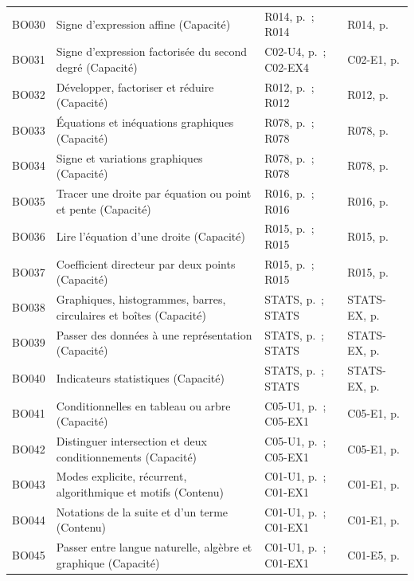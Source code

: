 \begin{longtable}{p{.1\linewidth}p{.43\linewidth}p{.19\linewidth}p{.16\linewidth}}
BO030 & Signe d’expression affine (Capacité) & R014, p.\,\pageref{R014} ; R014 & R014, p.\,\pageref{R014} \\
BO031 & Signe d’expression factorisée du second degré (Capacité) & C02-U4, p.\,\pageref{C02-U4} ; C02-EX4 & C02-E1, p.\,\pageref{C02-E1} \\
BO032 & Développer, factoriser et réduire (Capacité) & R012, p.\,\pageref{R012} ; R012 & R012, p.\,\pageref{R012} \\
BO033 & Équations et inéquations graphiques (Capacité) & R078, p.\,\pageref{R078} ; R078 & R078, p.\,\pageref{R078} \\
BO034 & Signe et variations graphiques (Capacité) & R078, p.\,\pageref{R078} ; R078 & R078, p.\,\pageref{R078} \\
BO035 & Tracer une droite par équation ou point et pente (Capacité) & R016, p.\,\pageref{R016} ; R016 & R016, p.\,\pageref{R016} \\
BO036 & Lire l’équation d’une droite (Capacité) & R015, p.\,\pageref{R015} ; R015 & R015, p.\,\pageref{R015} \\
BO037 & Coefficient directeur par deux points (Capacité) & R015, p.\,\pageref{R015} ; R015 & R015, p.\,\pageref{R015} \\
BO038 & Graphiques, histogrammes, barres, circulaires et boîtes (Capacité) & STATS, p.\,\pageref{STATS} ; STATS & STATS-EX, p.\,\pageref{STATS-EX} \\
BO039 & Passer des données à une représentation (Capacité) & STATS, p.\,\pageref{STATS} ; STATS & STATS-EX, p.\,\pageref{STATS-EX} \\
BO040 & Indicateurs statistiques (Capacité) & STATS, p.\,\pageref{STATS} ; STATS & STATS-EX, p.\,\pageref{STATS-EX} \\
BO041 & Conditionnelles en tableau ou arbre (Capacité) & C05-U1, p.\,\pageref{C05-U1} ; C05-EX1 & C05-E1, p.\,\pageref{C05-E1} \\
BO042 & Distinguer intersection et deux conditionnements (Capacité) & C05-U1, p.\,\pageref{C05-U1} ; C05-EX1 & C05-E1, p.\,\pageref{C05-E1} \\
BO043 & Modes explicite, récurrent, algorithmique et motifs (Contenu) & C01-U1, p.\,\pageref{C01-U1} ; C01-EX1 & C01-E1, p.\,\pageref{C01-E1} \\
BO044 & Notations de la suite et d’un terme (Contenu) & C01-U1, p.\,\pageref{C01-U1} ; C01-EX1 & C01-E1, p.\,\pageref{C01-E1} \\
BO045 & Passer entre langue naturelle, algèbre et graphique (Capacité) & C01-U1, p.\,\pageref{C01-U1} ; C01-EX1 & C01-E5, p.\,\pageref{C01-E5} \\

\end{longtable}

